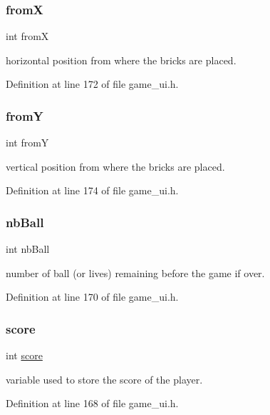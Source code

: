 \subsubsection{\texorpdfstring{fromX}{fromX}}
{\footnotesize\ttfamily int fromX}

horizontal position from where the bricks are placed. 

Definition at line 172 of file game\+\_\+ui.\+h.

\mbox{\label{structgame__t_a546e3a938f0bbf34f001c54c80a8d004}} 
\subsubsection{\texorpdfstring{fromY}{fromY}}
{\footnotesize\ttfamily int fromY}

vertical position from where the bricks are placed. 

Definition at line 174 of file game\+\_\+ui.\+h.

\mbox{\label{structgame__t_ae0c7df2c3c2bb3eb2aad3bfc63f563c3}} 
\subsubsection{\texorpdfstring{nb\+Ball}{nbBall}}
{\footnotesize\ttfamily int nb\+Ball}

number of ball (or lives) remaining before the game if over. 

Definition at line 170 of file game\+\_\+ui.\+h.

\mbox{\label{structgame__t_aef160b7437d94056f1dc59646cd5b87d}} 
\subsubsection{\texorpdfstring{score}{score}}
{\footnotesize\ttfamily int \hyperlink{structscore}{score}}

variable used to store the score of the player. 

Definition at line 168 of file game\+\_\+ui.\+h.

\mbox{\label{structgame__t_a8da59cbd18dd05d7e77b0c9b47646fef}} 
